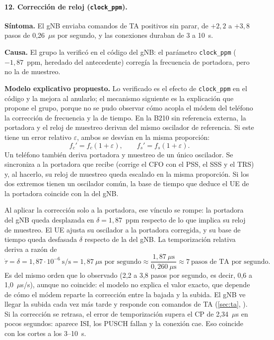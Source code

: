 \paragraph{12. Corrección de reloj (\texttt{clock\_ppm}).}
\textbf{Síntoma.} El gNB enviaba comandos de TA positivos sin parar, de $+2{,}2$ a $+3{,}8$ pasos de 0,26~$\mu$s por segundo, y las conexiones duraban de 3 a 10~s.

\textbf{Causa.} El grupo la verificó en el código del gNB: el parámetro \texttt{clock\_ppm} ($-1{,}87$~ppm, heredado del antecedente) corregía la frecuencia de portadora, pero no la de muestreo.

\textbf{Modelo explicativo propuesto.} Lo verificado es el efecto de \texttt{clock\_ppm} en el código y la mejora al anularlo; el mecanismo siguiente es la explicación que propone el grupo, porque no se pudo observar cómo acopla el módem del teléfono la corrección de frecuencia y la de tiempo. En la B210 sin referencia externa, la portadora y el reloj de muestreo derivan del mismo oscilador de referencia. Si este tiene un error relativo $\varepsilon$, ambos se desvían en la misma proporción:
\begin{equation}
f_c' = f_c(1+\varepsilon),\qquad f_s' = f_s(1+\varepsilon).
\end{equation}
Un teléfono también deriva portadora y muestreo de un único oscilador. Se sincroniza a la portadora que recibe (corrige el CFO con el PSS, el SSS y el TRS) y, al hacerlo, su reloj de muestreo queda escalado en la misma proporción. Si los dos extremos tienen un oscilador común, la base de tiempo que deduce el UE de la portadora coincide con la del gNB.

Al aplicar la corrección solo a la portadora, ese vínculo se rompe: la portadora del gNB queda desplazada en $\delta = 1{,}87$~ppm respecto de lo que implica su reloj de muestreo. El UE ajusta su oscilador a la portadora corregida, y su base de tiempo queda desfasada $\delta$ respecto de la del gNB. La temporización relativa deriva a razón de
\begin{equation}
\dot{\tau} = \delta = 1{,}87\cdot 10^{-6}~\text{s/s} = 1{,}87~\mu\text{s por segundo} \approx \frac{1{,}87~\mu\text{s}}{0{,}260~\mu\text{s}} \approx 7~\text{pasos de TA por segundo}.
\end{equation}
Es del mismo orden que lo observado (2,2 a 3,8 pasos por segundo, es decir, 0,6 a 1,0~$\mu$s/s), aunque no coincide: el modelo no explica el valor exacto, que depende de cómo el módem reparte la corrección entre la bajada y la subida. El gNB ve llegar la subida cada vez más tarde y responde con comandos de TA (\cref{sec:ta}, \cite[§4.2]{ts38213}). Si la corrección se retrasa, el error de temporización supera el CP de 2,34~$\mu$s en pocos segundos: aparece ISI, los PUSCH fallan y la conexión cae. Eso coincide con los cortes a los 3--10~s.

